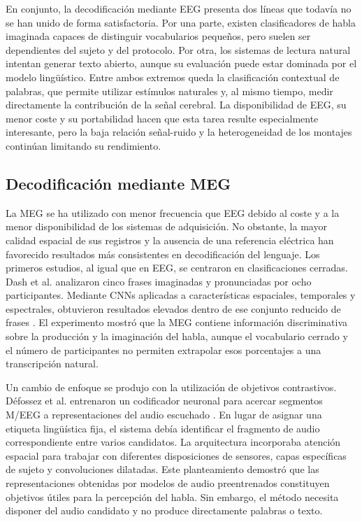 En conjunto, la decodificación mediante EEG presenta dos líneas que todavía no se han unido de forma satisfactoria. Por una parte, existen clasificadores de habla imaginada capaces de distinguir vocabularios pequeños, pero suelen ser dependientes del sujeto y del protocolo. Por otra, los sistemas de lectura natural intentan generar texto abierto, aunque su evaluación puede estar dominada por el modelo lingüístico. Entre ambos extremos queda la clasificación contextual de palabras, que permite utilizar estímulos naturales y, al mismo tiempo, medir directamente la contribución de la señal cerebral. La disponibilidad de EEG, su menor coste y su portabilidad hacen que esta tarea resulte especialmente interesante, pero la baja relación señal-ruido y la heterogeneidad de los montajes continúan limitando su rendimiento.

\subsection{Decodificación mediante MEG}

La MEG se ha utilizado con menor frecuencia que EEG debido al coste y a la menor disponibilidad de los sistemas de adquisición. No obstante, la mayor calidad espacial de sus registros y la ausencia de una referencia eléctrica han favorecido resultados más consistentes en decodificación del lenguaje. Los primeros estudios, al igual que en EEG, se centraron en clasificaciones cerradas. Dash et al. analizaron cinco frases imaginadas y pronunciadas por ocho participantes. Mediante CNNs aplicadas a características espaciales, temporales y espectrales, obtuvieron resultados elevados dentro de ese conjunto reducido de frases \cite{dash2020megphrases}. El experimento mostró que la MEG contiene información discriminativa sobre la producción y la imaginación del habla, aunque el vocabulario cerrado y el número de participantes no permiten extrapolar esos porcentajes a una transcripción natural.

Un cambio de enfoque se produjo con la utilización de objetivos contrastivos. Défossez et al. entrenaron un codificador neuronal para acercar segmentos M/EEG a representaciones del audio escuchado \cite{defossez2023speech}. En lugar de asignar una etiqueta lingüística fija, el sistema debía identificar el fragmento de audio correspondiente entre varios candidatos. La arquitectura incorporaba atención espacial para trabajar con diferentes disposiciones de sensores, capas específicas de sujeto y convoluciones dilatadas. Este planteamiento demostró que las representaciones obtenidas por modelos de audio preentrenados constituyen objetivos útiles para la percepción del habla. Sin embargo, el método necesita disponer del audio candidato y no produce directamente palabras o texto.


